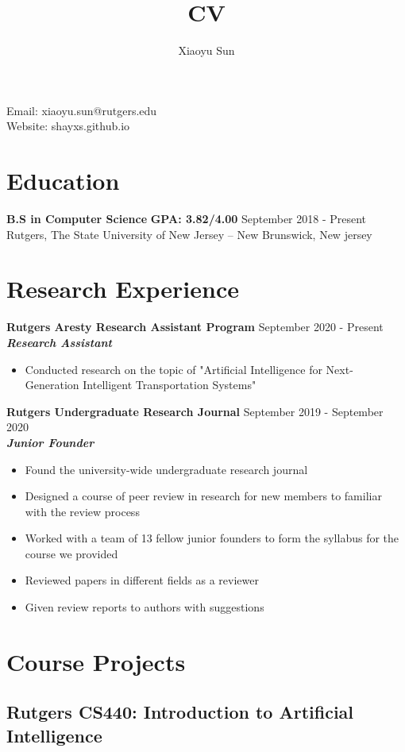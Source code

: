 \documentclass{article}
\makeatletter
\renewcommand{\maketitle}{
\begin{center}
{\huge\bfseries
\theauthor}

\vspace{.25em}

Email: xiaoyu.sun@rutgers.edu\\
Website: shayxs.github.io
\end{center}
}
\makeatother
\begin{document}
\title{CV}
\author{Xiaoyu Sun}
\maketitle

\section{Education}
\textbf{B.S in Computer Science} \space \textbf{GPA: 3.82/4.00}
\hfill{September 2018 - Present}\\
Rutgers, The State University of New Jersey – New Brunswick, New jersey

\section{Research Experience}
\textbf{Rutgers Aresty Research Assistant Program}
\hfill{September 2020 - Present}\\
\textit{\textbf{Research Assistant}}
\begin{itemize}
  \itemsep0em
  \item Conducted research on the topic of "Artificial Intelligence for Next-Generation Intelligent Transportation Systems"\\
\end{itemize}

\noindent \textbf{Rutgers Undergraduate Research Journal}
\hfill{September 2019 - September 2020}\\
\textit{\textbf{Junior Founder}}
\begin{itemize}
  \itemsep0em
  \item Found the university-wide undergraduate research journal
  \item Designed a course of peer review in research for new members to familiar with the
review process
  \item  Worked with a team of 13 fellow junior founders to form the syllabus for the course we
provided
  \item Reviewed papers in different fields as a reviewer
  \item Given review reports to authors with suggestions
\end{itemize}


\section{Course Projects}
\subsection*{Rutgers CS440: Introduction to Artificial Intelligence}
\end{document}
